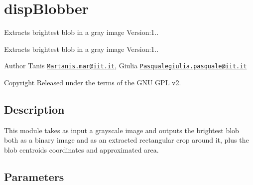 \section{disp\+Blobber}
\label{group__dispBlobber}


Extracts brightest blob in a gray image Version\+:1..  


Extracts brightest blob in a gray image Version\+:1.. 

\begin{DoxyAuthor}{Author}
Tanis \href{mailto:Martanis.mar@iit.it}{\tt Martanis.\+mar@iit.\+it}, Giulia \href{mailto:Pasqualegiulia.pasquale@iit.it}{\tt Pasqualegiulia.\+pasquale@iit.\+it} ~\newline
 
\end{DoxyAuthor}
\begin{DoxyCopyright}{Copyright}
Released under the terms of the G\+NU G\+PL v2. 
\end{DoxyCopyright}
\hypertarget{group__seg2cloud_intro_sec}{}\subsection{Description}\label{group__seg2cloud_intro_sec}
This module takes as input a grayscale image and outputs the brightest blob both as a binary image and as an extracted rectangular crop around it, plus the blob centroid\textquotesingle{}s coordinates and approximated area.\hypertarget{group__seg2cloud_parameters_sec}{}\subsection{Parameters}\label{group__seg2cloud_parameters_sec}

